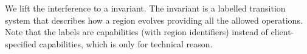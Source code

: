 
We lift the interference to a invariant.
The invariant is a labelled transition system that describes how a region evolves providing all the allowed operations.
Note that the labels are capabilities (with region identifiers) instead of client-specified capabilities, which is only for technical reason.

